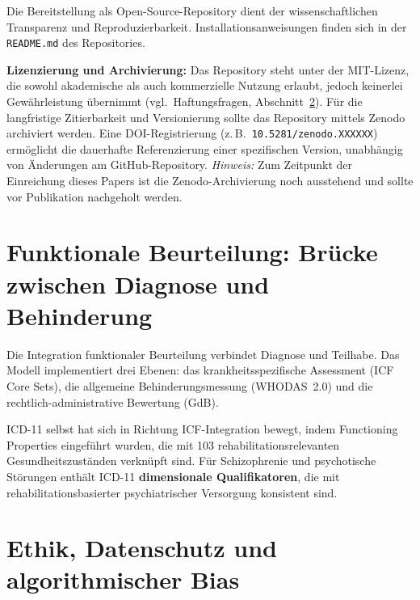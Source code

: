 \documentclass[11pt,a4paper]{article}
\begin{document}
\noindent Die Bereitstellung als Open-Source-Repository dient der wissenschaftlichen Transparenz und Reproduzierbarkeit. Installationsanweisungen finden sich in der \texttt{README.md} des Repositories.

\textbf{Lizenzierung und Archivierung:} Das Repository steht unter der MIT-Lizenz, die sowohl akademische als auch kommerzielle Nutzung erlaubt, jedoch keinerlei Gew\"ahrleistung \"ubernimmt (vgl.\ Haftungsfragen, Abschnitt~\ref{sec:ethik}). F\"ur die langfristige Zitierbarkeit und Versionierung sollte das Repository mittels Zenodo archiviert werden. Eine DOI-Registrierung (z.\,B.\ \texttt{10.5281/zenodo.XXXXXX}) erm\"oglicht die dauerhafte Referenzierung einer spezifischen Version, unabh\"angig von \"Anderungen am GitHub-Repository. \textit{Hinweis:} Zum Zeitpunkt der Einreichung dieses Papers ist die Zenodo-Archivierung noch ausstehend und sollte vor Publikation nachgeholt werden.


\section{Funktionale Beurteilung: Br\"ucke zwischen Diagnose und Behinderung}
\label{sec:funktional}

Die Integration funktionaler Beurteilung verbindet Diagnose und Teilhabe. Das Modell implementiert drei Ebenen: das krankheitsspezifische Assessment (ICF Core Sets), die allgemeine Behinderungsmessung (WHODAS~2.0) und die rechtlich-administrative Bewertung (GdB).

ICD-11 selbst hat sich in Richtung ICF-Integration bewegt, indem \glqq Functioning Properties\grqq{} eingef\"uhrt wurden, die mit 103 rehabilitationsrelevanten Gesundheitszust\"anden verkn\"upft sind. F\"ur Schizophrenie und psychotische St\"orungen enth\"alt ICD-11 \textbf{dimensionale Qualifikatoren}, die mit rehabilitationsbasierter psychiatrischer Versorgung konsistent sind.


\section{Ethik, Datenschutz und algorithmischer Bias}
\label{sec:ethik}
\end{document}
